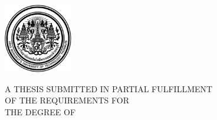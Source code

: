 \begin{titlepage}
    \begin{center}
    
    \includegraphics[width=3cm]{images/Black_logo.jpg}\\[1cm]
    
    \fontsize{13}{15}\selectfont
    {\MakeUppercase{\thesistitle}}
    
    \vspace{5cm}
    
    {\authorname}
    
    \vspace{5cm}
    
    {A THESIS SUBMITTED IN PARTIAL FULFILLMENT}\\
    {OF THE REQUIREMENTS FOR}\\
    {THE DEGREE OF \degree}\\
    {\field}
    
    \vspace{2cm}
    
    {\faculty}\\
    {\university}\\
    {\academicyear}
    
    \end{center}
    \end{titlepage}
    
